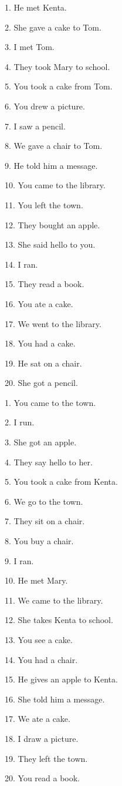\documentclass[uplatex,
paper=a4,
fontsize=18pt,
jafontsize=16pt,
number_of_lines=30,
line_length=30zh,
baselineskip=25pt,
]{jlreq}
\begin{document}
\newpage
{}
1.  He met Kenta.

2.  She gave a cake to Tom.

3.  I met Tom.

4.  They took Mary to school.

5.  You took a cake from Tom.

6.  You drew a picture.

7.  I saw a pencil.

8.  We gave a chair to Tom.

9.  He told him a message.

10.  You came to the library.

11.  You left the town.

12.  They bought an apple.

13.  She said hello to you.

14.  I ran.

15.  They read a book.

16.  You ate a cake.

17.  We went to the library.

18.  You had a cake.

19.  He sat on a chair.

20.  She got a pencil.


\newpage
{}
1.  You came to the town.

2.  I run.

3.  She got an apple.

4.  They say hello to her.

5.  You took a cake from Kenta.

6.  We go to the town.

7.  They sit on a chair.

8.  You buy a chair.

9.  I ran.

10.  He met Mary.

11.  We came to the library.

12.  She takes Kenta to school.

13.  You see a cake.

14.  You had a chair.

15.  He gives an apple to Kenta.

16.  She told him a message.

17.  We ate a cake.

18.  I draw a picture.

19.  They left the town.

20.  You read a book.
\end{document}
